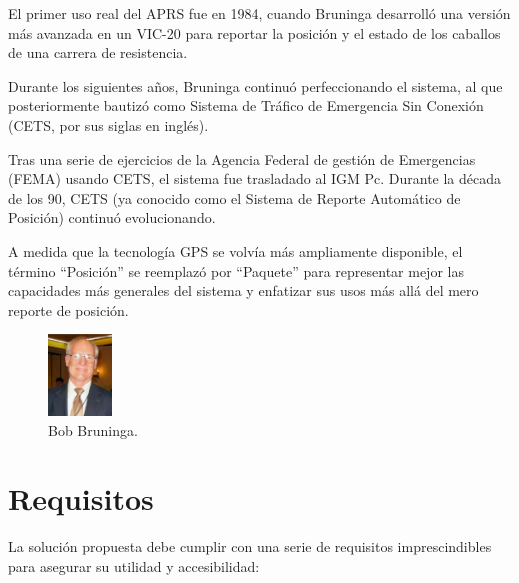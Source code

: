 El primer uso real del APRS fue en 1984, cuando Bruninga desarrolló una versión más avanzada en un VIC-20 para reportar la posición y el estado de los caballos de una carrera de resistencia.

Durante los siguientes años, Bruninga continuó perfeccionando el sistema, al que posteriormente bautizó como Sistema de Tráfico de Emergencia Sin Conexión (CETS, por sus siglas en inglés).

Tras una serie de ejercicios de la Agencia Federal de gestión de Emergencias (FEMA) usando CETS, el sistema fue trasladado al IGM Pc. Durante la década de los 90, CETS (ya conocido como el Sistema de Reporte Automático de Posición) continuó evolucionando.

A medida que la tecnología GPS se volvía más ampliamente disponible, el término ``Posición'' se reemplazó por ``Paquete'' para representar mejor las capacidades más generales del sistema y enfatizar sus usos más allá del mero reporte de posición.

\begin{figure}[h]
	\centering
	\includegraphics[width=0.15\textwidth]{Imagenes//Chapter_1/bob_bruninga.png}
	\caption{Bob Bruninga.}
	\label{fig:bob-bruninga}
\end{figure}

\section{Requisitos}

La solución propuesta debe cumplir con una serie de requisitos imprescindibles para asegurar su utilidad y accesibilidad:

